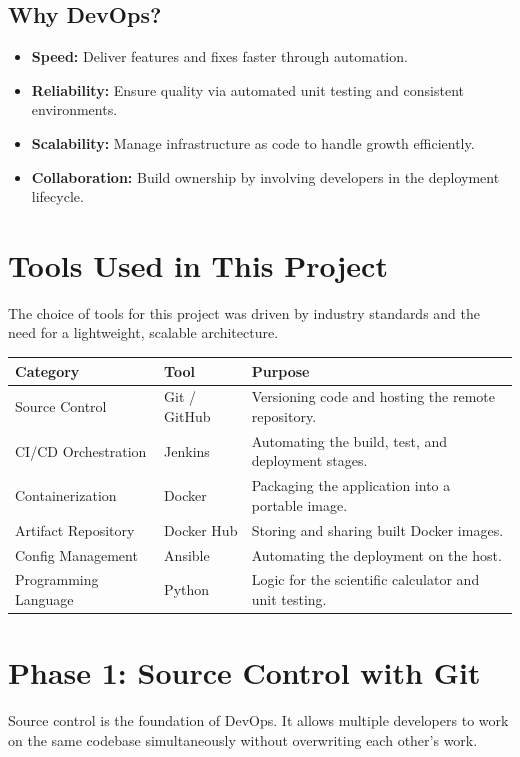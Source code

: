 \documentclass[12pt,a4paper]{article}
\begin{document}
\subsection{Why DevOps?}
\begin{itemize}[noitemsep]
\item \textbf{Speed:} Deliver features and fixes faster through automation.
\item \textbf{Reliability:} Ensure quality via automated unit testing and consistent environments.
\item \textbf{Scalability:} Manage infrastructure as code to handle growth efficiently.
\item \textbf{Collaboration:} Build ownership by involving developers in the deployment lifecycle.
\end{itemize}

\section{Tools Used in This Project}
The choice of tools for this project was driven by industry standards and the need for a lightweight, scalable architecture.

\clearpage
\begin{longtable}{|p{3.5cm}|p{3.5cm}|p{7cm}|}
\hline
\textbf{Category} & \textbf{Tool} & \textbf{Purpose} \\
\hline
Source Control & Git / GitHub & Versioning code and hosting the remote repository. \\
\hline
CI/CD Orchestration & Jenkins & Automating the build, test, and deployment stages. \\
\hline
Containerization & Docker & Packaging the application into a portable image. \\
\hline
Artifact Repository & Docker Hub & Storing and sharing built Docker images. \\
\hline
Config Management & Ansible & Automating the deployment on the host. \\
\hline
Programming Language & Python & Logic for the scientific calculator and unit testing. \\
\hline
\end{longtable}

\section{Phase 1: Source Control with Git}
Source control is the foundation of DevOps. It allows multiple developers to work on the same codebase simultaneously without overwriting each other's work.
\end{document}
